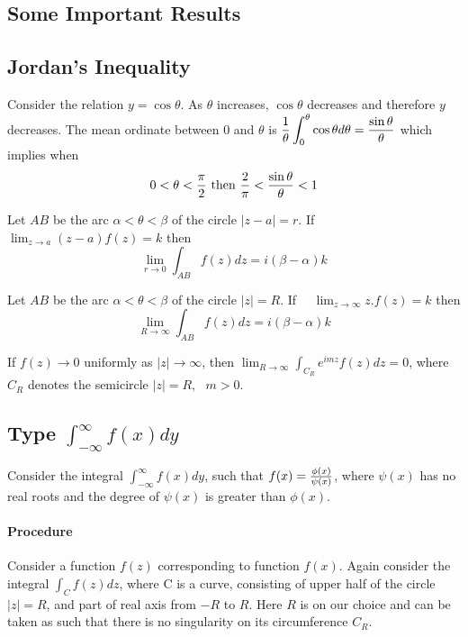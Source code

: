 \subsection{Some Important Results}
\subsection*{Jordan's Inequality} Consider the relation $y=\cos \theta$. As $\theta$ increases, $\cos\theta$ decreases and therefore $y$ decreases. The mean ordinate between $0$ and $\theta$ is $ \displaystyle 
{1 \over \theta} \int_0^{\theta} \cos\theta d\theta = {\sin\theta \over \theta} $
which implies when 
\[0<\theta < {\pi \over 2} \text{ then } \frac{2}{\pi}< {\sin\theta \over \theta} < 1\]
\begin{theorem}
Let $AB$ be the arc $\alpha < \theta < \beta$ of the circle $|z-a|=r$. If ~~$\lim_{z \rightarrow a} (z-a) f(z) = k$ then
\[\lim_{r \rightarrow 0} \int_{AB} f(z) dz = i(\beta - \alpha)k\]
\end{theorem}
\begin{theorem}
Let $AB$ be the arc $\alpha < \theta < \beta$ of the circle $|z|=R$. If ~~$\lim_{z \rightarrow \infty} z.f(z) = k$ then
\[\lim_{R \rightarrow \infty} \int_{AB} f(z) dz = i(\beta - \alpha)k\]
\end{theorem}
\begin{theorem}
If $f(z) \rightarrow 0$ uniformly as $|z| \rightarrow \infty$, then  $\lim_{R \rightarrow \infty} \int_{C_R} e^{imz}f(z) dz = 0$, where $C_R$ denotes  the semicircle $|z|=R, ~~~m>0$. 
\end{theorem}
\subsection{Type $\int_{-\infty}^{\infty} f(x) dy$}
Consider the integral $\int_{-\infty}^{\infty} f(x) dy$, such that $f(x) = {\phi (x) \over \psi (x)}$, where $\psi (x)$ has no real roots and the degree of $\psi (x)$ is greater than $\phi (x)$.
\paragraph{Procedure}
Consider a function $f(z)$ corresponding to function $f(x)$. 
Again consider the integral $\int_C f(z) dz$, where C is a curve, consisting of upper half of the circle $|z|=R$, and part of real axis from $-R$ to $R$. Here $R$ is on our choice and can be taken as such that there is no singularity  on its circumference $C_R$.

